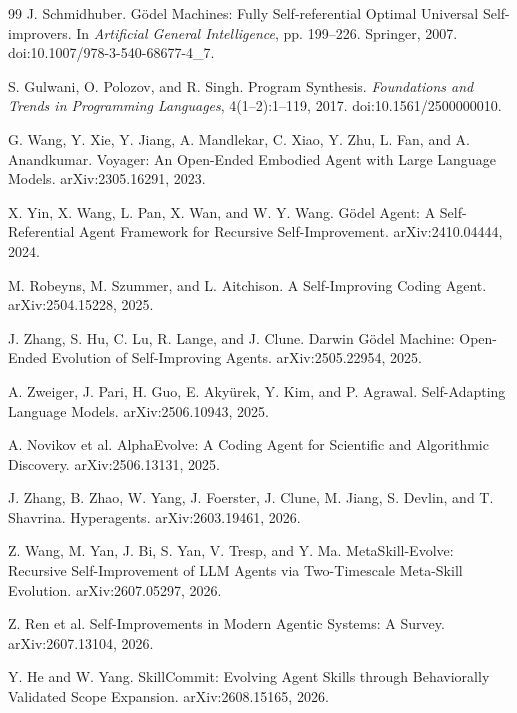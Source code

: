 \documentclass[10pt]{article}
\begin{document}
\begin{thebibliography}{99}
J. Schmidhuber.
\newblock G{\"o}del Machines: Fully Self-referential Optimal Universal Self-improvers.
\newblock In \emph{Artificial General Intelligence}, pp. 199--226. Springer, 2007.
\newblock doi:10.1007/978-3-540-68677-4\_7.

S. Gulwani, O. Polozov, and R. Singh.
\newblock Program Synthesis.
\newblock \emph{Foundations and Trends in Programming Languages}, 4(1--2):1--119, 2017.
\newblock doi:10.1561/2500000010.

G. Wang, Y. Xie, Y. Jiang, A. Mandlekar, C. Xiao, Y. Zhu, L. Fan, and A. Anandkumar.
\newblock Voyager: An Open-Ended Embodied Agent with Large Language Models.
\newblock arXiv:2305.16291, 2023.

X. Yin, X. Wang, L. Pan, X. Wan, and W. Y. Wang.
\newblock G{\"o}del Agent: A Self-Referential Agent Framework for Recursive Self-Improvement.
\newblock arXiv:2410.04444, 2024.

M. Robeyns, M. Szummer, and L. Aitchison.
\newblock A Self-Improving Coding Agent.
\newblock arXiv:2504.15228, 2025.

J. Zhang, S. Hu, C. Lu, R. Lange, and J. Clune.
\newblock Darwin G{\"o}del Machine: Open-Ended Evolution of Self-Improving Agents.
\newblock arXiv:2505.22954, 2025.

A. Zweiger, J. Pari, H. Guo, E. Aky{\"u}rek, Y. Kim, and P. Agrawal.
\newblock Self-Adapting Language Models.
\newblock arXiv:2506.10943, 2025.

A. Novikov et al.
\newblock AlphaEvolve: A Coding Agent for Scientific and Algorithmic Discovery.
\newblock arXiv:2506.13131, 2025.

J. Zhang, B. Zhao, W. Yang, J. Foerster, J. Clune, M. Jiang, S. Devlin, and T. Shavrina.
\newblock Hyperagents.
\newblock arXiv:2603.19461, 2026.

Z. Wang, M. Yan, J. Bi, S. Yan, V. Tresp, and Y. Ma.
\newblock MetaSkill-Evolve: Recursive Self-Improvement of LLM Agents via Two-Timescale Meta-Skill Evolution.
\newblock arXiv:2607.05297, 2026.

Z. Ren et al.
\newblock Self-Improvements in Modern Agentic Systems: A Survey.
\newblock arXiv:2607.13104, 2026.

Y. He and W. Yang.
\newblock SkillCommit: Evolving Agent Skills through Behaviorally Validated Scope Expansion.
\newblock arXiv:2608.15165, 2026.
\end{thebibliography}
\end{document}
